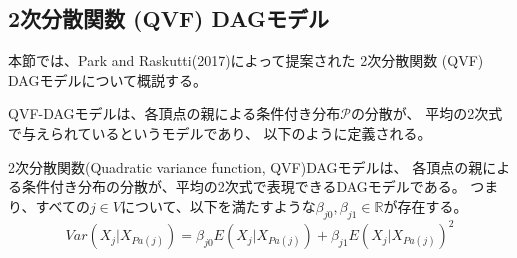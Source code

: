 
\subsection{2次分散関数 (QVF) DAGモデル}

本節では、Park and Raskutti(2017)\cite{Park2017-hw}によって提案された
2次分散関数 (QVF) DAGモデルについて概説する。

QVF-DAGモデルは、各頂点の親による条件付き分布$\mathcal P$の分散が、
平均の2次式で与えられているというモデルであり、
以下のように定義される。

\begin{df}
2次分散関数(Quadratic variance function, QVF)DAGモデルは、
各頂点の親による条件付き分布の分散が、平均の2次式で表現できるDAGモデルである。
つまり、すべての$j \in V$について、以下を満たすような$\beta_{j0}, \beta_{j1} \in \mathbb R$が存在する。
\begin{equation}
\mathit{Var}(X_j|X_{Pa(j)}) = \beta_{j0} E(X_j | X_{Pa(j)}) + \beta_{j1} E(X_j | X_{Pa(j)})^2
\end{equation}
\end{df}
